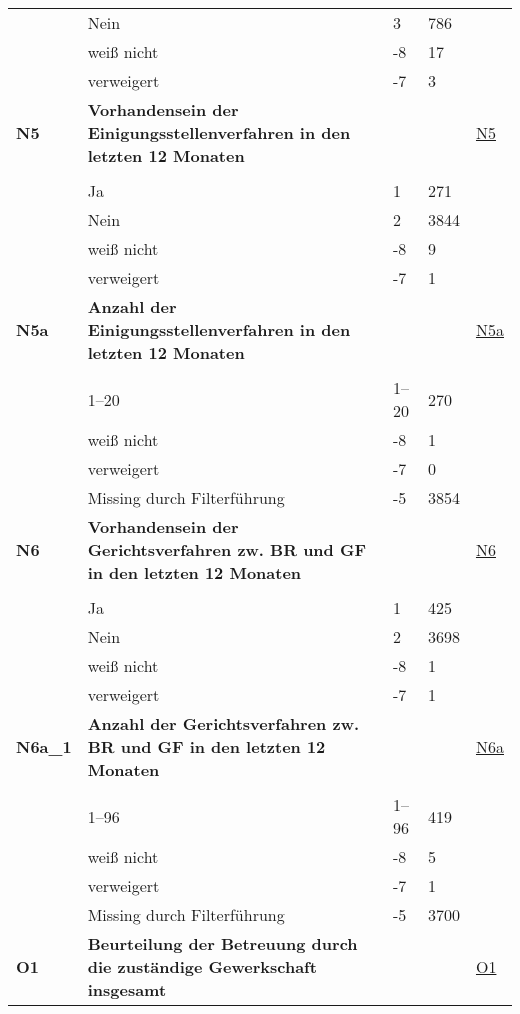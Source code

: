 \begin{longtable}{| L{2.5cm} | L{8.25cm}| C{1.5cm} | R{1.25cm} | C{2.25cm} |  }
   & Nein & 3 & 786 &  \\ 
   & weiß nicht & -8 & 17 &  \\ 
   & verweigert & -7 & 3 &  \\ 
   \midrule
\textbf{N5}\label{var:suf:N5} & \textbf{Vorhandensein der Einigungsstellenverfahren in den letzten 12 Monaten} &  &  & \hyperref[N5]{N5} \\ 
   &  &  &  &  \\ 
   & Ja & 1 & 271 &  \\ 
   & Nein & 2 & 3844 &  \\ 
   & weiß nicht & -8 & 9 &  \\ 
   & verweigert & -7 & 1 &  \\ 
   \midrule
\textbf{N5a}\label{var:suf:N5a} & \textbf{Anzahl der Einigungsstellenverfahren in den letzten 12 Monaten} &  &  & \hyperref[N5a]{N5a} \\ 
   &  &  &  &  \\ 
   & 1--20 & 1--20 & 270 &  \\ 
   & weiß nicht & -8 & 1 &  \\ 
   & verweigert & -7 & 0 &  \\ 
   & Missing durch Filterführung & -5 & 3854 &  \\ 
   \midrule
\textbf{N6}\label{var:suf:N6} & \textbf{Vorhandensein der Gerichtsverfahren zw. BR und GF in den letzten 12 Monaten} &  &  & \hyperref[N6]{N6} \\ 
   &  &  &  &  \\ 
   & Ja & 1 & 425 &  \\ 
   & Nein & 2 & 3698 &  \\ 
   & weiß nicht & -8 & 1 &  \\ 
   & verweigert & -7 & 1 &  \\ 
   \midrule
\textbf{N6a\_1}\label{var:suf:N6a:1} & \textbf{Anzahl der Gerichtsverfahren zw. BR und GF in den letzten 12 Monaten} &  &  & \hyperref[N6a]{N6a} \\ 
   &  &  &  &  \\ 
   & 1--96 & 1--96 & 419 &  \\ 
   & weiß nicht & -8 & 5 &  \\ 
   & verweigert & -7 & 1 &  \\ 
   & Missing durch Filterführung & -5 & 3700 &  \\ 
   \midrule
\textbf{O1}\label{var:suf:O1} & \textbf{Beurteilung der Betreuung durch die zuständige Gewerkschaft insgesamt} &  &  & \hyperref[O1]{O1} \\ 

\end{longtable}
